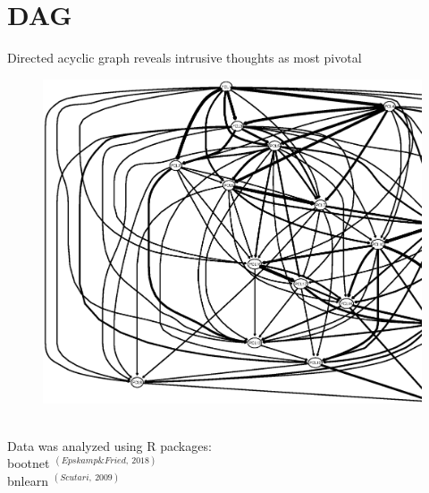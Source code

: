 \documentclass[]{betterposter}
\begin{document}
{\section{DAG}
\begin{center}
Directed acyclic graph reveals intrusive thoughts as most pivotal
\begin{figure}
    \centering
    \includegraphics[width=\textwidth, height=1.05\textwidth]{img/pcl_DAG.eps}
    \label{fig:my_label}
\end{figure}
\end{center}

\\
Data was analyzed using R packages: \\
bootnet $^{(Epskamp \& Fried,\ 2018)}$ \\
bnlearn $^{(Scutari,\ 2009)}$

}
\end{document}
